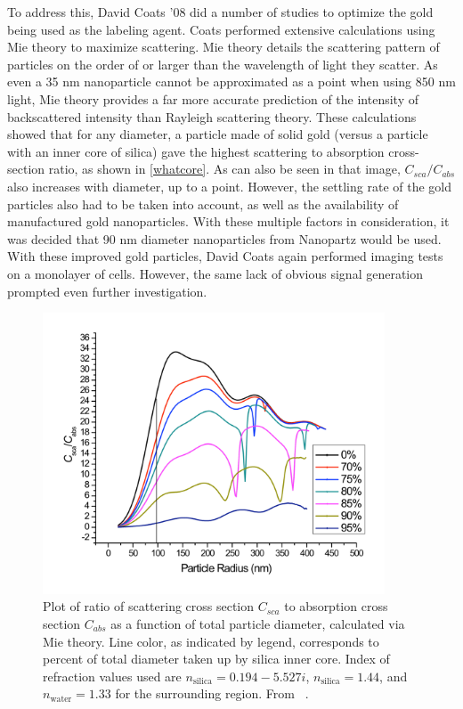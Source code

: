 To address this, David Coats '08 did a number of studies to optimize the gold being used as the labeling agent. Coats performed extensive calculations using Mie theory to maximize scattering. Mie theory details the scattering pattern of particles on the order of or larger than the wavelength of light they scatter. As even a 35 nm nanoparticle cannot be approximated as a point when using 850 nm light, Mie theory provides a far more accurate prediction of the intensity of backscattered intensity than Rayleigh scattering theory. These calculations showed that for any diameter, a particle made of solid gold (versus a particle with an inner core of silica) gave the highest scattering to absorption cross-section ratio, as shown in \autoref{whatcore}. As can also be seen in that image, $C_{sca}/C_{abs}$ also increases with diameter, up to a point. However, the settling rate of the gold particles also had to be taken into account, as well as the availability of manufactured gold nanoparticles. With these multiple factors in consideration, it was decided that 90 nm diameter nanoparticles from Nanopartz would be used. With these improved gold particles, David Coats again performed imaging tests on a monolayer of cells. However, the same lack of obvious signal generation prompted even further investigation.

\begin{figure}[htbp]
\centering
\includegraphics[keepaspectratio,width=4in,height=0.75\textheight]{CscaCabs.pdf}
\caption{Plot of ratio of scattering cross section $C_{sca}$ to absorption cross section $C_{abs}$ as a function of total particle diameter, calculated via Mie theory. Line color, as indicated by legend, corresponds to percent of total diameter taken up by silica inner core. Index of refraction values used are $n_{\mathrm{silica}}=0.194 - 5.527i$, $n_{\mathrm{silica}}=1.44$, and $n_{\mathrm{water}}=1.33$ for the surrounding region. From ~\citep{coats}.}
\label{whatcore}
\end{figure}



